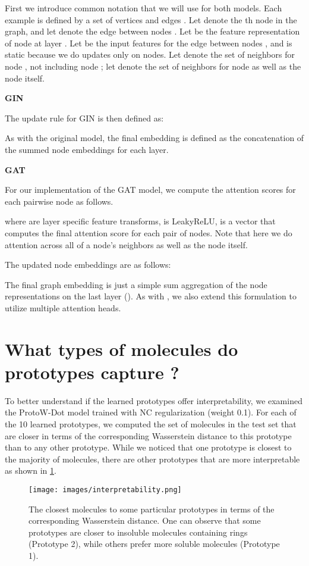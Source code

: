 \documentclass[letterpaper]{article} \usepackage{aaai22}  \usepackage{times}  \usepackage{helvet}  \usepackage{courier}  \usepackage[hyphens]{url}  \usepackage{graphicx} \urlstyle{rm} \def\UrlFont{\rm}  \usepackage{natbib}  \usepackage{caption} \DeclareCaptionStyle{ruled}{labelfont=normalfont,labelsep=colon,strut=off} \frenchspacing  \setlength{\pdfpagewidth}{8.5in}  \setlength{\pdfpageheight}{11in}  \usepackage{algorithm}
\begin{document}
First we introduce common notation that we will use for both models. Each example is defined by a set of vertices and edges . Let  denote the th node in the graph, and let  denote the edge between nodes . Let  be the feature representation of node  at layer . Let  be the input features for the edge between nodes , and is static because we do updates only on nodes. Let  denote the set of neighbors for node , not including node ; let  denote the set of neighbors for node  as well as the node itself.

\textbf{GIN} 

The update rule for GIN is then defined as:



As with the original model, the final embedding  is defined as the concatenation of the summed node embeddings for each layer.



\textbf{GAT}

For our implementation of the GAT model, we compute the attention scores for each pairwise node  as follows.





where  are layer specific feature transforms,  is LeakyReLU,  is a vector that computes the final attention score for each pair of nodes. Note that here we do attention across all of a node's neighbors as well as the node itself.

The updated node embeddings are as follows:



The final graph embedding is just a simple sum aggregation of the node representations on the last layer (). As with \citep{velivckovic2017graph}, we also extend this formulation to utilize multiple attention heads.


\section{What types of molecules do prototypes capture ?} \label{apx:interp}

To better understand if the learned prototypes offer interpretability, we examined the ProtoW-Dot model trained with NC regularization (weight 0.1). For each of the 10 learned prototypes, we computed the set of molecules in the test set that are closer in terms of the corresponding Wasserstein distance to this prototype than to any other prototype. While we noticed that one prototype is closest to the majority of molecules, there are other prototypes that are more interpretable as shown in \cref{fig:interpr}.

\begin{figure}[h]
    \centering
    \texttt{[image: images/interpretability.png]}
    \caption{The closest molecules to some particular prototypes in terms of the corresponding Wasserstein distance. One can observe that some prototypes are closer to insoluble molecules containing rings (Prototype 2), while others prefer more soluble molecules (Prototype 1).  } 
    \label{fig:interpr}
\end{figure}


\end{document}
